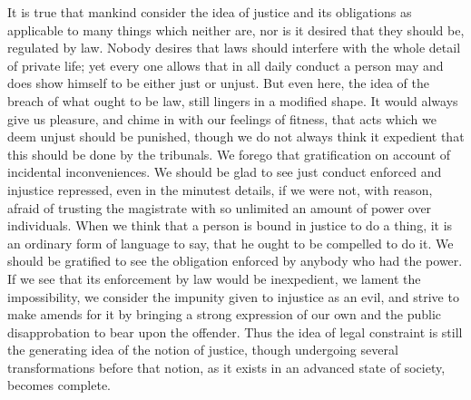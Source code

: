 \documentclass[12pt]{report}
\begin{document}
It is true that mankind consider the idea of justice and its obligations as applicable to many things which neither are, nor is it desired that they should be, regulated by law. Nobody desires that laws should interfere with the whole detail of private life; yet every one allows that in all daily conduct a person may and does show himself to be either just or unjust. But even here, the idea of the breach of what ought to be law, still lingers in a modified shape. It would always give us pleasure, and chime in with our feelings of fitness, that acts which we deem unjust should be punished, though we do not always think it expedient that this should be done by the tribunals. We forego that gratification on account of incidental inconveniences. We should be glad to see just conduct enforced and injustice repressed, even in the minutest details, if we were not, with reason, afraid of trusting the magistrate with so unlimited an amount of power over individuals. When we think that a person is bound in justice to do a thing, it is an ordinary form of language to say, that he ought to be compelled to do it. We should be gratified to see the obligation enforced by anybody who had the power. If we see that its enforcement by law would be inexpedient, we lament the impossibility, we consider the impunity given to injustice as an evil, and strive to make amends for it by bringing a strong expression of our own and the public disapprobation to bear upon the offender. Thus the idea of legal constraint is still the generating idea of the notion of justice, though undergoing several transformations before that notion, as it exists in an advanced state of society, becomes complete.
\end{document}
